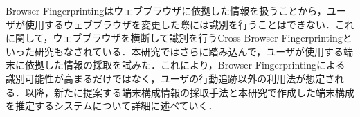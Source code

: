 Browser Fingerprintingはウェブブラウザに依拠した情報を扱うことから，ユーザが使用するウェブブラウザを変更した際には識別を行うことはできない．これに関して，ウェブブラウザを横断して識別を行うCross Browser Fingerprintingといった研究もなされている．本研究ではさらに踏み込んで，ユーザが使用する端末に依拠した情報の採取を試みた．これにより，Browser Fingerprintingによる識別可能性が高まるだけではなく，ユーザの行動追跡以外の利用法が想定される．以降，新たに提案する端末構成情報の採取手法と本研究で作成した端末構成を推定するシステムについて詳細に述べていく．
